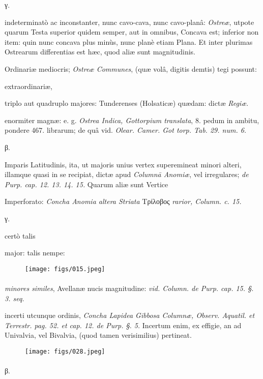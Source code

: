 \documentclass[a4paper, 11pt, oneside, polutonikogreek, german]{article}
\begin{document}
γ.

indeterminatò ac inconstanter, nunc cavo-cava, nunc cavo-planâ: \emph{Ostreæ}, utpote quarum Testa superior quidem semper, aut in omnibus, Concava est; inferior non item: quin nunc concava plus minùs, nunc planè etiam Plana. Et inter plurimas Ostrearum differentias est hæc, quod aliæ sunt magnitudinis.

Ordinariæ mediocris; \emph{Ostreæ Communes}, (quæ volâ, digitis demtis) tegi possunt:

extraordinariæ,

triplo aut quadruplo majores: Tunderenses (Holsaticæ) quædam: dictæ \emph{Regiæ}.

enormiter magnæ: e. g. \emph{Ostrea Indica, Gottorpium translata}, 8. pedum in ambitu, pondere 467. librarum; de quâ vid. \emph{Olear. Camer. Got torp. Tab. 29. num. 6.}

β.

Imparis Latitudinis, ita, ut majoris unius vertex superemineat minori alteri, illamque quasi in se recipiat, dictæ apud \emph{Columnā Anomiæ}, vel irregulares; \emph{de Purp. cap. 12. 13. 14. 15.} Quarum aliæ sunt Vertice

Imperforato: \emph{Concha Anomia altera Striata} Τρίλοβος \emph{rarior, Column. c. 15.}

γ.

certò talis

major: talis nempe:

\begin{figure}[H]
\centering
\texttt{[image: figs/015.jpeg]}
\end{figure}
\paragraph{}
\emph{minores similes}, Avellanæ nucis magnitudine: \emph{vid. Column. de Purp. cap. 15. §. 3. seq.}

incerti utcunque ordinis, \emph{Concha Lapidea Gibbosa Columnæ, Observ. Aquatil. et Terrestr. pag. 52. et cap. 12. de Purp. §. 5.} Incertum enim, ex effigie, an ad Univalvia, vel Bivalvia, (quod tamen verisimilius) pertineat.

\begin{figure}[H]
\centering
\texttt{[image: figs/028.jpeg]}
\end{figure}
\paragraph{}
β.
\end{document}
